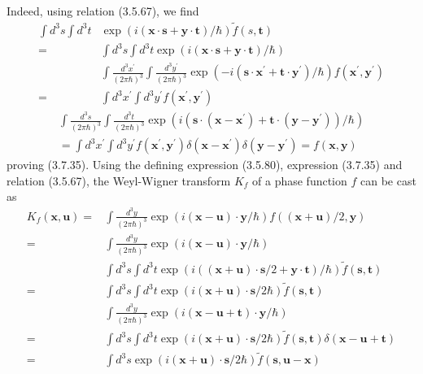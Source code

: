 \documentclass{article}
\begin{document}
Indeed, using relation (3.5.67), we find
$$
\begin{align*}
\int d^{3} s \int d^{3} t & \exp (i(\boldsymbol{x} \cdot \boldsymbol{s}+\boldsymbol{y} \cdot \boldsymbol{t}) / \hbar) \tilde{f}(s, \boldsymbol{t})  \tag{3.7.36}\\
= & \int d^{3} s \int d^{3} t \exp (i(\boldsymbol{x} \cdot \boldsymbol{s}+\boldsymbol{y} \cdot \boldsymbol{t}) / \hbar) \\
& \int \frac{d^{3} x^{\prime}}{(2 \pi \hbar)^{3}} \int \frac{d^{3} y^{\prime}}{(2 \pi \hbar)^{3}} \exp \left(-i\left(\boldsymbol{s} \cdot \boldsymbol{x}^{\prime}+\boldsymbol{t} \cdot \boldsymbol{y}^{\prime}\right) / \hbar\right) f\left(\boldsymbol{x}^{\prime}, \boldsymbol{y}^{\prime}\right) \\
= & \int d^{3} x^{\prime} \int d^{3} y^{\prime} f\left(\boldsymbol{x}^{\prime}, \boldsymbol{y}^{\prime}\right)
\end{align*}
$$
$$
\begin{array}{r}
\int \frac{d^{3} s}{(2 \pi \hbar)^{3}} \int \frac{d^{3} t}{(2 \pi \hbar)^{3}} \exp \left(i\left(\boldsymbol{s} \cdot\left(\boldsymbol{x}-\boldsymbol{x}^{\prime}\right)+\boldsymbol{t} \cdot\left(\boldsymbol{y}-\boldsymbol{y}^{\prime}\right)\right) / \hbar\right) \\
=\int d^{3} x^{\prime} \int d^{3} y^{\prime} f\left(\boldsymbol{x}^{\prime}, \boldsymbol{y}^{\prime}\right) \delta\left(\boldsymbol{x}-\boldsymbol{x}^{\prime}\right) \delta\left(\boldsymbol{y}-\boldsymbol{y}^{\prime}\right)=f(\boldsymbol{x}, \boldsymbol{y})
\end{array}
$$
proving (3.7.35).
Using the defining expression (3.5.80), expression (3.7.35) and relation (3.5.67), the Weyl-Wigner transform $K_{f}$ of a phase function $f$ can be cast as
$$
\begin{align*}
K_{f}(\boldsymbol{x}, \boldsymbol{u})= & \int \frac{d^{3} y}{(2 \pi \hbar)^{3}} \exp (i(\boldsymbol{x}-\boldsymbol{u}) \cdot \boldsymbol{y} / \hbar) f((\boldsymbol{x}+\boldsymbol{u}) / 2, \boldsymbol{y})  \tag{3.7.37}\\
= & \int \frac{d^{3} y}{(2 \pi \hbar)^{3}} \exp (i(\boldsymbol{x}-\boldsymbol{u}) \cdot \boldsymbol{y} / \hbar) \\
& \int d^{3} s \int d^{3} t \exp (i((\boldsymbol{x}+\boldsymbol{u}) \cdot \boldsymbol{s} / 2+\boldsymbol{y} \cdot \boldsymbol{t}) / \hbar) \tilde{f}(\boldsymbol{s}, \boldsymbol{t}) \\
= & \int d^{3} s \int d^{3} t \exp (i(\boldsymbol{x}+\boldsymbol{u}) \cdot \boldsymbol{s} / 2 \hbar) \tilde{f}(\boldsymbol{s}, \boldsymbol{t}) \\
& \int \frac{d^{3} y}{(2 \pi \hbar)^{3}} \exp (i(\boldsymbol{x}-\boldsymbol{u}+\boldsymbol{t}) \cdot \boldsymbol{y} / \hbar) \\
= & \int d^{3} s \int d^{3} t \exp (i(\boldsymbol{x}+\boldsymbol{u}) \cdot \boldsymbol{s} / 2 \hbar) \tilde{f}(\boldsymbol{s}, \boldsymbol{t}) \delta(\boldsymbol{x}-\boldsymbol{u}+\boldsymbol{t}) \\
= & \int d^{3} s \exp (i(\boldsymbol{x}+\boldsymbol{u}) \cdot \boldsymbol{s} / 2 \hbar) \tilde{f}(\boldsymbol{s}, \boldsymbol{u}-\boldsymbol{x})
\end{align*}
$$
\end{document}
